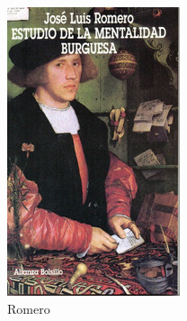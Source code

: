 \documentclass[a4paper,10pt]{book}
\begin{document}
\begin{figure}[ht!]
\begin{subfigure}[b]{0.25\textwidth}
    \includegraphics[width=0.9\linewidth]{static/romero}
    \caption{Romero}
    \label{}
    \end{subfigure}
    \begin{subfigure}[b]{0.25\textwidth}
    \centering

\end{subfigure}
\end{figure}
\end{document}
